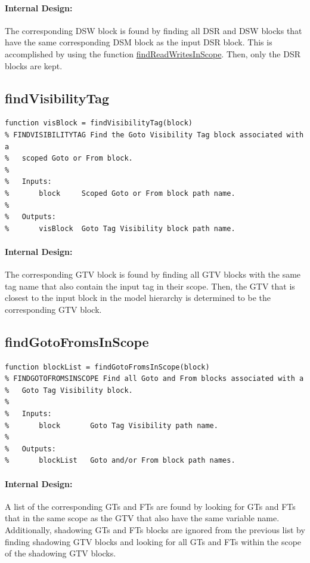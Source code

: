 \documentclass[12pt,letterpaper]{report}
\begin{document}
\paragraph{Internal Design:} The corresponding DSW block is found by finding all DSR and DSW blocks that have the same corresponding DSM block as the input DSR block. This is accomplished by using the function \hyperref[findReadWritesInScope]{findReadWritesInScope}. Then, only the DSR blocks are kept.

\subsection{findVisibilityTag} \label{findVisibilityTag}
\begin{lstlisting}
function visBlock = findVisibilityTag(block)
% FINDVISIBILITYTAG Find the Goto Visibility Tag block associated with a
%   scoped Goto or From block.
%
%   Inputs:
%       block     Scoped Goto or From block path name.
%
%   Outputs:
%       visBlock  Goto Tag Visibility block path name.
\end{lstlisting}
\paragraph{Internal Design:} The corresponding GTV block is found by finding all GTV blocks with the same tag name that also contain the input tag in their scope. Then, the GTV that is closest to the input block in the model hierarchy is determined to be the corresponding GTV block.

\subsection{findGotoFromsInScope}
\begin{lstlisting}
function blockList = findGotoFromsInScope(block)
% FINDGOTOFROMSINSCOPE Find all Goto and From blocks associated with a
%   Goto Tag Visibility block.
%
%   Inputs:
%       block       Goto Tag Visibility path name.
%
%   Outputs:
%       blockList   Goto and/or From block path names.
\end{lstlisting}
\paragraph{Internal Design:} A list of the corresponding GTs and FTs are found by looking for GTs and FTs that in the same scope as the GTV that also have the same variable name. Additionally, shadowing GTs and FTs blocks are ignored from the previous list by finding shadowing GTV blocks and looking for all GTs and FTs within the scope of the shadowing GTV blocks.
\end{document}
